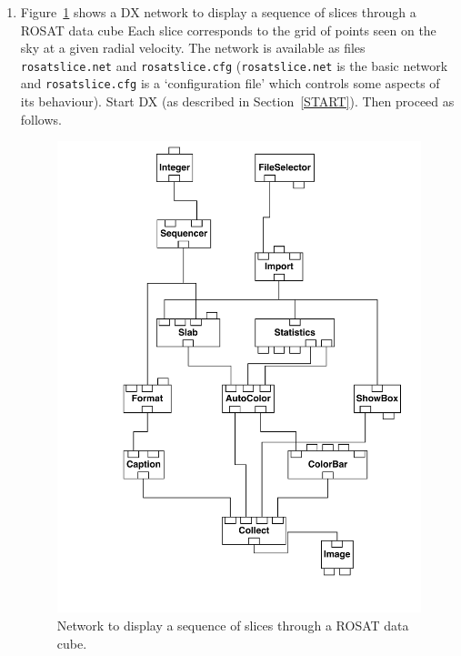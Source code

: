 \documentclass[twoside,11pt]{article}
\begin{document}
\begin{enumerate}
  \item Figure~\ref{ROSATSLICE} shows a DX network to display a sequence
   of slices through a ROSAT data cube Each slice corresponds to the
   grid of points seen on the sky at a given radial velocity.  The network
   is available as files {\tt rosatslice.net} and {\tt rosatslice.cfg}
   ({\tt rosatslice.net} is the basic network and {\tt rosatslice.cfg} is
   a `configuration file' which controls some aspects of its behaviour).
   Start DX (as described in Section~\ref{START}).  Then proceed as
   follows.

  \begin{figure}[htbp]

  \begin{center}
  \leavevmode
  \includegraphics[width=450pt]{sc2_rosatslice}
  \end{center}

  \caption[Network to display a sequence of slices through a ROSAT
   data cube.]{Network to display a sequence of slices through a ROSAT
   data cube. \label{ROSATSLICE} }


\end{figure}
\end{enumerate}
\end{document}

